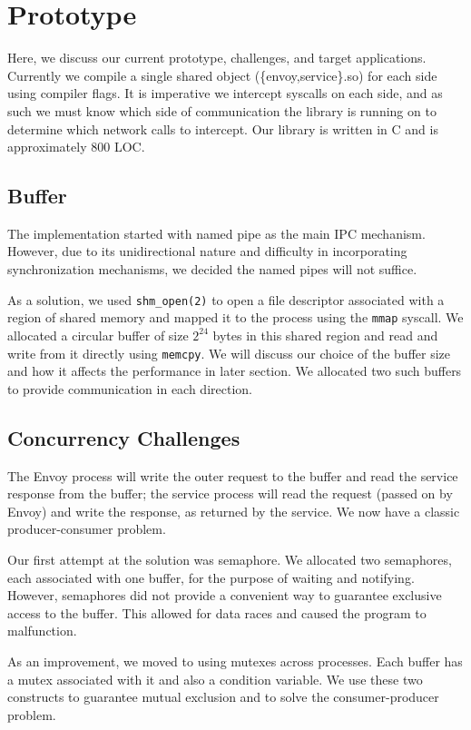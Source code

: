 \section{Prototype}
\label{sec:prototype}
Here, we discuss our current prototype, challenges, and target applications.
Currently we compile a single shared object (\{envoy,service\}.so) for each side using compiler flags.
It is imperative we intercept syscalls on each side, and as such we must know which side of communication the library is running on to determine which network calls to intercept.
Our library is written in C and is approximately 800 LOC.

\subsection{\sysname Buffer}
The implementation started with named pipe as the main IPC mechanism.
However, due to its unidirectional nature and difficulty in incorporating synchronization mechanisms, we decided the named pipes will not suffice.

As a solution, we used \texttt{shm\_open(2)} to open a file descriptor associated with a region of shared memory and mapped it to the process using the \texttt{mmap} syscall. We allocated a circular buffer of size $2^{24}$ bytes in this shared region and read and write from it directly using \texttt{memcpy}. We will discuss our choice of the buffer size and how it affects the performance in later section. We allocated two such buffers to provide communication in each direction.

\subsection{Concurrency Challenges}
The Envoy process will write the outer request to the buffer and read the service response from the buffer; the service process will read the request (passed on by Envoy) and write the response, as returned by the service.
We now have a classic producer-consumer problem.

Our first attempt at the solution was semaphore.
We allocated two semaphores, each associated with one buffer, for the purpose of waiting and notifying.
However, semaphores did not provide a convenient way to guarantee exclusive access to the buffer.
This allowed for data races and caused the program to malfunction.

As an improvement, we moved to using mutexes across processes.
Each buffer has a mutex associated with it and also a condition variable.
We use these two constructs to guarantee mutual exclusion and to solve the consumer-producer problem.



